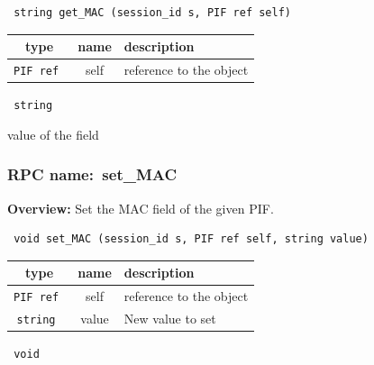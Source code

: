 \begin{verbatim} string get_MAC (session_id s, PIF ref self)\end{verbatim}



 
\vspace{0.3cm}
\begin{tabular}{|c|c|p{7cm}|}
 \hline
{\bf type} & {\bf name} & {\bf description} \\ \hline
{\tt PIF ref } & self & reference to the object \\ \hline 

\end{tabular}

\vspace{0.3cm}

{\tt 
string
}


value of the field
\vspace{0.3cm}
\vspace{0.3cm}
\vspace{0.3cm}
\subsubsection{RPC name:~set\_MAC}

{\bf Overview:} 
Set the MAC field of the given PIF.

\begin{verbatim} void set_MAC (session_id s, PIF ref self, string value)\end{verbatim}



 
\vspace{0.3cm}
\begin{tabular}{|c|c|p{7cm}|}
 \hline
{\bf type} & {\bf name} & {\bf description} \\ \hline
{\tt PIF ref } & self & reference to the object \\ \hline 

{\tt string } & value & New value to set \\ \hline 

\end{tabular}

\vspace{0.3cm}

{\tt 
void
}



\vspace{0.3cm}
\vspace{0.3cm}
\vspace{0.3cm}
